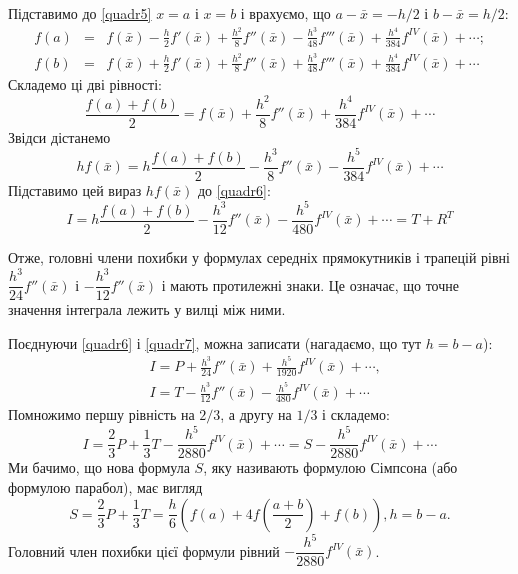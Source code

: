 \documentclass[14pt,twoside]{extreport}
\theoremstyle{mystyle}
\numberwithin{equation}{chapter}
\begin{document}
Підставимо до \eqref{quadr5} $x = a$ і $x = b$ і врахуємо, що $a - \bar{x} = -h/2$ і $b - \bar{x} = h/2$:
\begin{equation*}
\begin{array}{lll}
f(a)&=&f(\displaystyle \bar{x})-\frac{h}{2}f'(\bar{x})+\frac{h^{2}}{8}f''(\bar{x})-\frac{h^{3}}{48}f'''(\bar{x})+\frac{h^{4}}{384}f^{IV}(\bar{x})+\cdots;\\
f(b)&=&f(\displaystyle \bar{x})+\frac{h}{2}f'(\bar{x})+\frac{h^{2}}{8}f''(\bar{x})+\frac{h^{3}}{48}f'''(\bar{x})+\frac{h^{4}}{384}f^{IV}(\bar{x})+\cdots
\end{array}
\end{equation*}
Складемо ці дві рівності:
\[
\frac{f(a)+f(b)}{2}=f(\bar{x})+\frac{h^{2}}{8}f''(\bar{x})+\frac{h^{4}}{384}f^{IV}(\bar{x})+\cdots
\]
Звідси дістанемо
\[
hf(\bar{x})=h\frac{f(a)+f(b)}{2}-\frac{h^{3}}{8}f''(\bar{x})-\frac{h^{5}}{384}f^{IV}(\bar{x})+\cdots
\]
Підставимо цей вираз $hf(\bar{x})$ до \eqref{quadr6}:
\begin{equation}\label{quadr7}
I=h\displaystyle \frac{f(a)+f(b)}{2}-\frac{h^{3}}{12}f''(\bar{x})-\frac{h^{5}}{480}f^{IV}(\bar{x})+\cdots= T+R^{T}
\end{equation}

Отже, головні члени похибки у формулах середніх прямокутників і трапецій рівні $\dfrac{h^3}{24}f''(\bar{x})$ і $-\dfrac{h^3}{12}f''(\bar{x})$ і мають протилежні знаки. Це означає, що точне значення інтеграла лежить у вилці між ними.

Поєднуючи \eqref{quadr6} і \eqref{quadr7}, можна записати (нагадаємо, що тут $h=b-a$):
\begin{align*}
&I= P + \frac{h^3}{24}f''(\bar{x})+\frac{h^5}{1920}f^{IV}(\bar{x})+\cdots,\\
&I= T - \frac{h^3}{12}f''(\bar{x})-\frac{h^5}{480}f^{IV}(\bar{x})+\cdots
\end{align*}
Помножимо першу рівність на $2/3$, а другу на $1/3$ і складемо:
\[
I=\displaystyle \frac{2}{3}P+\frac{1}{3}T-\frac{h^{5}}{2880}f^{IV}(\bar{x})+\cdots=S-\frac{h^{5}}{2880}f^{IV}(\bar{x})+\cdots
\]
Ми бачимо, що нова формула $S$, яку називають формулою Сімпсона (або формулою парабол), має вигляд
\begin{equation}\label{quadr8}
S=\displaystyle \frac{2}{3}P+\frac{1}{3}T=\frac{h}{6}\left(f(a)+4f\left(\frac{a+b}{2}\right)+f(b)\right), h=b-a.
\end{equation}
Головний член похибки цієї формули рівний $-\dfrac{h^5}{2880}f^{IV}(\bar{x})$.
\end{document}
